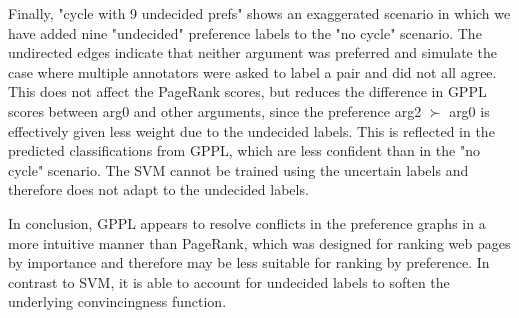 Finally, "cycle with 9 undecided prefs" shows an exaggerated scenario in which
we have added nine "undecided" preference labels to the "no cycle" scenario.
The undirected edges indicate that neither argument was preferred and simulate the
case where multiple annotators were asked to label a pair and did not all agree. 
This does
not affect the PageRank scores, but reduces the difference in GPPL scores between arg0 and other arguments, since the preference arg2 $\succ$ arg0 is
effectively given less weight due to the undecided labels. This is reflected in the 
predicted classifications from GPPL, which are less confident than in the "no cycle" scenario.
The SVM cannot be trained using the uncertain labels and therefore does not adapt to the undecided labels. 

In conclusion, GPPL appears to resolve conflicts in the preference graphs in a
more intuitive manner than PageRank, which was designed for ranking web pages by 
importance and therefore may be less suitable for ranking by preference. In contrast
to SVM, it is able to account for undecided labels to soften the underlying convincingness function.
